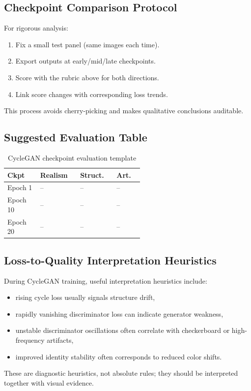 \documentclass[conference]{IEEEtran}
\begin{document}
\subsection{Checkpoint Comparison Protocol}
For rigorous analysis:
\begin{enumerate}
\item Fix a small test panel (same images each time).
\item Export outputs at early/mid/late checkpoints.
\item Score with the rubric above for both directions.
\item Link score changes with corresponding loss trends.
\end{enumerate}
This process avoids cherry-picking and makes qualitative conclusions auditable.

\subsection{Suggested Evaluation Table}
\begin{table}[!t]
\centering
\small
\caption{CycleGAN checkpoint evaluation template}
\begin{tabular}{|p{0.16\linewidth}|p{0.13\linewidth}|p{0.13\linewidth}|p{0.13\linewidth}|}
\hline
\textbf{Ckpt} & \textbf{Realism} & \textbf{Struct.} & \textbf{Art.} \\
\hline
Epoch 1 & -- & -- & -- \\
\hline
Epoch 10 & -- & -- & -- \\
\hline
Epoch 20 & -- & -- & -- \\
\hline
\end{tabular}
\end{table}

\subsection{Loss-to-Quality Interpretation Heuristics}
During CycleGAN training, useful interpretation heuristics include:
\begin{itemize}
\item rising cycle loss usually signals structure drift,
\item rapidly vanishing discriminator loss can indicate generator weakness,
\item unstable discriminator oscillations often correlate with checkerboard or high-frequency artifacts,
\item improved identity stability often corresponds to reduced color shifts.
\end{itemize}
These are diagnostic heuristics, not absolute rules; they should be interpreted together with visual evidence.
\end{document}
